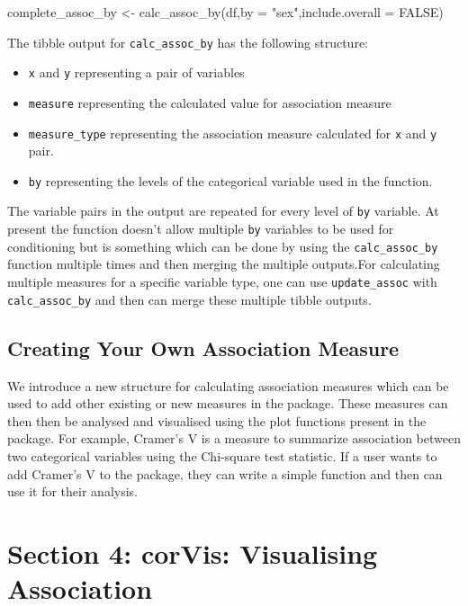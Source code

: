 \begin{Schunk}
\begin{Sinput}
complete_assoc_by <- calc_assoc_by(df,by = "sex",include.overall = FALSE)
\end{Sinput}
\end{Schunk}

The tibble output for \texttt{calc\_assoc\_by} has the following
structure:

\begin{itemize}
\tightlist
\item
  \texttt{x} and \texttt{y} representing a pair of variables
\item
  \texttt{measure} representing the calculated value for association
  measure
\item
  \texttt{measure\_type} representing the association measure calculated
  for \texttt{x} and \texttt{y} pair.
\item
  \texttt{by} representing the levels of the categorical variable used
  in the function.
\end{itemize}

The variable pairs in the output are repeated for every level of
\texttt{by} variable. At present the function doesn't allow multiple
\texttt{by} variables to be used for conditioning but is something which
can be done by using the \texttt{calc\_assoc\_by} function multiple
times and then merging the multiple outputs.For calculating multiple
measures for a specific variable type, one can use
\texttt{update\_assoc} with \texttt{calc\_assoc\_by} and then can merge
these multiple tibble outputs.

\hypertarget{creating-your-own-association-measure}{%
\subsection{Creating Your Own Association
Measure}\label{creating-your-own-association-measure}}

We introduce a new structure for calculating association measures which
can be used to add other existing or new measures in the package. These
measures can then then be analysed and visualised using the plot
functions present in the package. For example, Cramer's V is a measure
to summarize association between two categorical variables using the
Chi-square test statistic. If a user wants to add Cramer's V to the
package, they can write a simple function and then can use it for their
analysis.

\hypertarget{section-4-corvis-visualising-association}{%
\section{Section 4: corVis: Visualising
Association}\label{section-4-corvis-visualising-association}}

